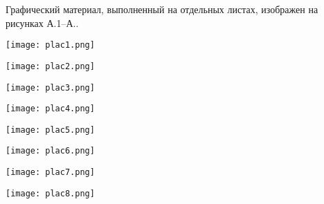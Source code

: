 
Графический материал, выполненный на отдельных листах,
изображен на рисунках А.1--А..
\setcounter{числоПлакатов}{0}

\renewcommand{\thefigure}{А.\arabic{figure}} %

\begin{landscape}

\begin{плакат}
	\texttt{[image: plac1.png]}
	\label{plac1:image}      
\end{плакат}

\begin{плакат}
	\texttt{[image: plac2.png]}
	\label{plac2:image}      
\end{плакат}


\begin{плакат}
	\texttt{[image: plac3.png]}
	\label{plac3:image}      
\end{плакат}


\begin{плакат}
	\texttt{[image: plac4.png]}
	\label{plac4:image}      
\end{плакат}


\begin{плакат}
	\texttt{[image: plac5.png]}
	\label{plac5:image}      
\end{плакат}


\begin{плакат}
	\texttt{[image: plac6.png]}
	\label{plac6:image}      
\end{плакат}


\begin{плакат}
	\texttt{[image: plac7.png]}
	\label{plac7:image}      
\end{плакат}

\begin{плакат}
	\texttt{[image: plac8.png]}
	\label{plac8:image}      
\end{плакат}

\end{landscape}

